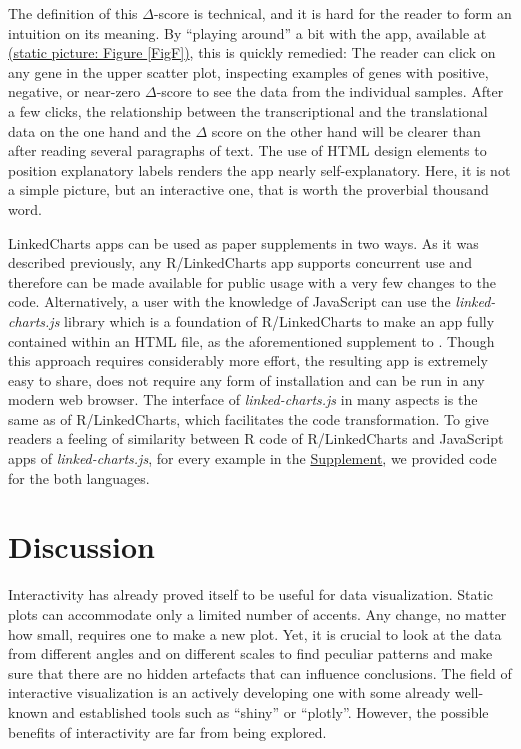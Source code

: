 \documentclass[twocolumn,10pt]{article}
\newcommand{\Supplement}{\href{https://anders-biostat.github.io/lc-paper/}{Supplement}}
\begin{document}
The definition of this $\Delta$-score is technical, and it is hard for the reader to form an intuition on its meaning. By ``playing around'' a bit with the app, available at \href{https://ex2plorer.kaessmannlab.org/}{(static picture: Figure \ref{FigF})}, this is quickly remedied:  The reader can click on any gene in the upper scatter plot, inspecting examples of genes with positive, negative, or near-zero $\Delta$-score to see the data from the individual samples. After a few clicks, the relationship between the transcriptional and the translational data on the one hand and the $\Delta$ score on the other hand will be clearer than after reading several paragraphs of text. The use of HTML design elements to position explanatory labels renders the app nearly self-explanatory. Here, it is not a simple picture, but an interactive one, that is worth the proverbial thousand word. 

LinkedCharts apps can be used as paper supplements in two ways. As it was described previously, any R/LinkedCharts app supports concurrent use and therefore can be made available for public usage with a very few changes to the code. Alternatively, a user with the knowledge of JavaScript can use the \emph{linked-charts.js} library which is a foundation of R/LinkedCharts to make an app fully contained within an HTML file, as the aforementioned supplement to \citet{wang_2020}. Though this approach requires considerably more effort, the resulting app is extremely easy to share, does not require any form of installation and can be run in any modern web browser. The interface of \emph{linked-charts.js} in many aspects is the same as of R/LinkedCharts, which facilitates the code transformation. To give readers a feeling of similarity between R code of R/LinkedCharts and JavaScript apps of \emph{linked-charts.js}, for every example in the \Supplement, we provided code for the both languages.

\section{Discussion}

Interactivity has already proved itself to be useful for data visualization. Static plots can accommodate only a limited number of accents. Any change, no matter how small, requires one to make a new plot. Yet, it is crucial to look at the data from different angles and on different scales to find peculiar patterns and make sure that there are no hidden artefacts that can influence conclusions. The field of interactive visualization is an actively developing one with some already well-known and established tools such as ``shiny'' \citep{shiny} or ``plotly''\citep{sievert_2020}. However, the possible benefits of interactivity are far from being explored.
\end{document}

